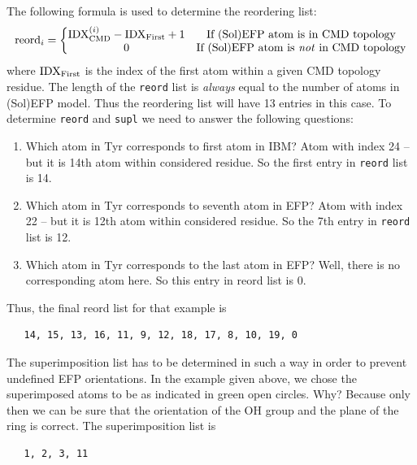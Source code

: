 \documentclass[a4paper,titlepage,twoside,fleqn,12pt]{book}
\begin{document}
\begin{refsection}
The following formula is used to determine the reordering list:
%
\begin{equation}   \label{e:reord-list}
{\rm reord}_i = 
\left\{\begin{matrix}
{\rm IDX}_{\rm CMD}^{(i)}
 - {\rm IDX}_{\rm First} + 1
                      & \text{If (Sol)EFP atom is in CMD topology}\\ 
0                     & \text{If (Sol)EFP atom is \emph{not} in CMD topology}
\end{matrix}\right.
\end{equation}
%
where ${\rm IDX}_{\rm First}$ is the index of the first atom 
within a given CMD topology residue.
The length of the {\tt reord} list is \emph{always} equal 
to the number of atoms in (Sol)EFP model. Thus
the reordering list will have 13 entries in this case.
To determine {\tt reord} and {\tt supl} we need to answer the following questions:
%
\begin{enumerate}
 \item Which atom in Tyr corresponds to first atom in IBM? Atom with index 24 -- but it is
14th atom within considered residue. So the first entry in {\tt reord} list is 14.
 \item Which atom in Tyr corresponds to seventh atom in EFP? Atom with index 22 -- but it is
12th atom within considered residue. So the 7th entry in {\tt reord} list is 12.
\item Which atom in Tyr corresponds to the last atom in EFP? Well, there is no corresponding
atom here. So this entry in reord list is 0.
\end{enumerate}
%
Thus, the final reord list for that example is 
%
\begin{verbatim}
   14, 15, 13, 16, 11, 9, 12, 18, 17, 8, 10, 19, 0
\end{verbatim}
%

The superimposition list has to be determined in such a way in order to prevent undefined EFP
orientations. In the example given above, we chose the superimposed atoms to be as indicated in green
open circles.
Why? Because only then we can be sure that the orientation of the OH group and the plane of the ring
is correct. The superimposition list is 
%
\begin{verbatim}
   1, 2, 3, 11
\end{verbatim}
%


\end{refsection}
\end{document}
